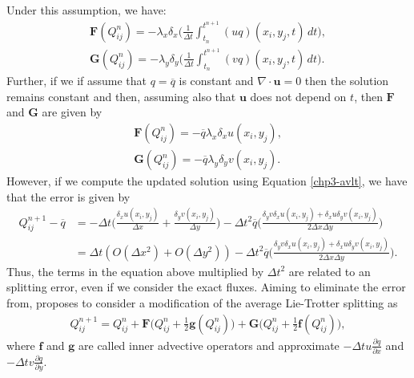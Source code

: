 Under this assumption, we have:
\begin{align*}
	\mathbf{F}(Q_{ij}^n) = -\lambda_x{\delta_x}\bigg(\frac{1}{\Delta t} \int_{t_n}^{t^{n+1}} (uq)(x_i,y_j,t) \,dt \bigg) ,\\
	\mathbf{G}(Q_{ij}^n) = -\lambda_y{\delta_y}\bigg(\frac{1}{\Delta t} \int_{t_n}^{t^{n+1}} (vq)(x_i,y_j,t) \,dt \bigg).
\end{align*}
Further, if we if assume that $q = \overline{q}$ is constant and $\nabla \cdot \boldsymbol{u} = 0$ then the solution
remains constant and then, assuming also that $\boldsymbol{u}$ does not depend on $t$, then $\mathbf{F}$ and $\mathbf{G}$ are given by
\begin{align*}
	\mathbf{F}(Q_{ij}^n) = -\overline{q} \lambda_x{\delta_x} u(x_i,y_j),\\
	\mathbf{G}(Q_{ij}^n) = -\overline{q} \lambda_y{\delta_y} v(x_i,y_j).
\end{align*}
However, if we compute the updated solution using Equation \eqref{chp3-avlt}, we have that the error is given by
\begin{align}
	\label{chp3-avlt-error}
	Q^{n+1}_{ij} - \overline{q} &= 
	-\Delta t \bigg(\frac{\delta_x u(x_i,y_j)}{\Delta x} + 	\frac{\delta_y v(x_i,y_j)}{\Delta y} \bigg)
	-\Delta t^2 \overline{q}\bigg( \frac{\delta_y v \delta_x u(x_i,y_j) + \delta_x u\delta_y v(x_i,y_j)}{2\Delta x \Delta y} \bigg) \\
	&= \Delta t (O(\Delta x^2) + O(\Delta y^2))
	   -\Delta t^2 \overline{q}\bigg( \frac{\delta_y v \delta_x u(x_i,y_j) + \delta_x u\delta_y v(x_i,y_j)}{2\Delta x \Delta y} \bigg).
\end{align}
Thus, the terms in the equation above multiplied by $\Delta t^2$ are related to an splitting error, even if we consider the exact fluxes.
Aiming to eliminate the error from, \citet{lin:1996} proposes to consider a modification of the average Lie-Trotter splitting as
\begin{align}
	\label{chp3-avlt2}
	Q^{n+1}_{ij} = Q_{ij}^n +  
	\mathbf{F}\bigg(Q_{ij}^n + \frac{1}{2}\mathbf{g}(Q_{ij}^n)\bigg) +  
	\mathbf{G}\bigg(Q_{ij}^n + \frac{1}{2}\mathbf{f}(Q_{ij}^n)\bigg),
\end{align}
where $\mathbf{f}$ and $\mathbf{g}$ are called inner advective operators and approximate
$-\Delta t u \frac{\partial q}{\partial x}$ and $-\Delta t v \frac{\partial q}{\partial y}$.

